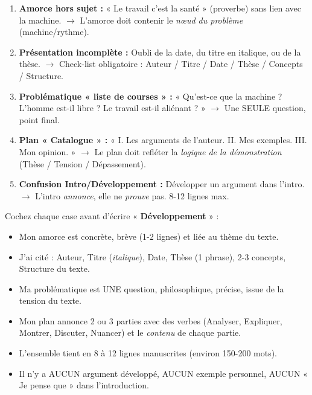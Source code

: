 \documentclass[11pt]{article}
\begin{document}
\begin{attention}
\begin{enumerate}
    \item \textbf{Amorce hors sujet :} « Le travail c'est la santé » (proverbe) sans lien avec la machine. $\rightarrow$ L'amorce doit contenir le \emph{nœud du problème} (machine/rythme).
    \item \textbf{Présentation incomplète :} Oubli de la date, du titre en italique, ou de la thèse. $\rightarrow$ Check-list obligatoire : Auteur / Titre / Date / Thèse / Concepts / Structure.
    \item \textbf{Problématique « liste de courses » :} « Qu'est-ce que la machine ? L'homme est-il libre ? Le travail est-il aliénant ? » $\rightarrow$ Une SEULE question, point final.
    \item \textbf{Plan « Catalogue » :} « I. Les arguments de l'auteur. II. Mes exemples. III. Mon opinion. » $\rightarrow$ Le plan doit refléter la \emph{logique de la démonstration} (Thèse / Tension / Dépassement).
    \item \textbf{Confusion Intro/Développement :} Développer un argument dans l'intro. $\rightarrow$ L'intro \emph{annonce}, elle ne \emph{prouve} pas. 8-12 lignes max.
\end{enumerate}
\end{attention}

\begin{methode}
Cochez chaque case avant d'écrire « \textbf{Développement} » :
\begin{itemize}
    \item[$\square$] Mon amorce est concrète, brève (1-2 lignes) et liée au thème du texte.
    \item[$\square$] J'ai cité : Auteur, Titre (\emph{italique}), Date, Thèse (1 phrase), 2-3 concepts, Structure du texte.
    \item[$\square$] Ma problématique est UNE question, philosophique, précise, issue de la tension du texte.
    \item[$\square$] Mon plan annonce 2 ou 3 parties avec des verbes (Analyser, Expliquer, Montrer, Discuter, Nuancer) et le \emph{contenu} de chaque partie.
    \item[$\square$] L'ensemble tient en 8 à 12 lignes manuscrites (environ 150-200 mots).
    \item[$\square$] Il n'y a AUCUN argument développé, AUCUN exemple personnel, AUCUN « Je pense que » dans l'introduction.
\end{itemize}
\end{methode}
\end{document}
